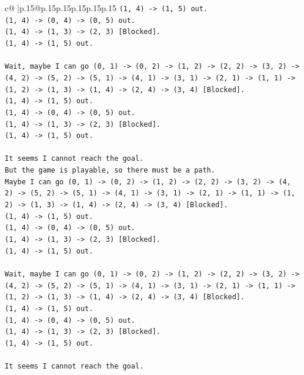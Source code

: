 \documentclass{article}
\begin{document}
{\begin{supertabular}{c@{$\;$}|p{.15\linewidth}@{}p{.15\linewidth}p{.15\linewidth}p{.15\linewidth}p{.15\linewidth}p{.15\linewidth}}
{{{\texttt{(1, 4) {-}> (1, 5) out.} \\
\texttt{(1, 4) {-}> (0, 4) {-}> (0, 5) out.} \\
\texttt{(1, 4) {-}> (1, 3) {-}> (2, 3) {[}Blocked{]}.} \\
\texttt{(1, 4) {-}> (1, 5) out.} \\
\\ 
\texttt{Wait, maybe I can go (0, 1) {-}> (0, 2) {-}> (1, 2) {-}> (2, 2) {-}> (3, 2) {-}> (4, 2) {-}> (5, 2) {-}> (5, 1) {-}> (4, 1) {-}> (3, 1) {-}> (2, 1) {-}> (1, 1) {-}> (1, 2) {-}> (1, 3) {-}> (1, 4) {-}> (2, 4) {-}> (3, 4) {[}Blocked{]}.} \\
\texttt{(1, 4) {-}> (1, 5) out.} \\
\texttt{(1, 4) {-}> (0, 4) {-}> (0, 5) out.} \\
\texttt{(1, 4) {-}> (1, 3) {-}> (2, 3) {[}Blocked{]}.} \\
\texttt{(1, 4) {-}> (1, 5) out.} \\
\\ 
\texttt{It seems I cannot reach the goal.} \\
\texttt{But the game is playable, so there must be a path.} \\
\texttt{Maybe I can go (0, 1) {-}> (0, 2) {-}> (1, 2) {-}> (2, 2) {-}> (3, 2) {-}> (4, 2) {-}> (5, 2) {-}> (5, 1) {-}> (4, 1) {-}> (3, 1) {-}> (2, 1) {-}> (1, 1) {-}> (1, 2) {-}> (1, 3) {-}> (1, 4) {-}> (2, 4) {-}> (3, 4) {[}Blocked{]}.} \\
\texttt{(1, 4) {-}> (1, 5) out.} \\
\texttt{(1, 4) {-}> (0, 4) {-}> (0, 5) out.} \\
\texttt{(1, 4) {-}> (1, 3) {-}> (2, 3) {[}Blocked{]}.} \\
\texttt{(1, 4) {-}> (1, 5) out.} \\
\\ 
\texttt{Wait, maybe I can go (0, 1) {-}> (0, 2) {-}> (1, 2) {-}> (2, 2) {-}> (3, 2) {-}> (4, 2) {-}> (5, 2) {-}> (5, 1) {-}> (4, 1) {-}> (3, 1) {-}> (2, 1) {-}> (1, 1) {-}> (1, 2) {-}> (1, 3) {-}> (1, 4) {-}> (2, 4) {-}> (3, 4) {[}Blocked{]}.} \\
\texttt{(1, 4) {-}> (1, 5) out.} \\
\texttt{(1, 4) {-}> (0, 4) {-}> (0, 5) out.} \\
\texttt{(1, 4) {-}> (1, 3) {-}> (2, 3) {[}Blocked{]}.} \\
\texttt{(1, 4) {-}> (1, 5) out.} \\
\\ 
\texttt{It seems I cannot reach the goal.} \\
}}}
\end{supertabular}}
\end{document}
